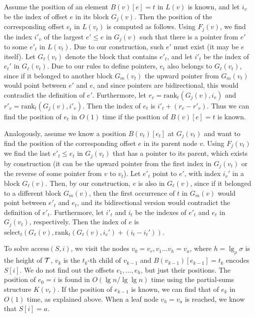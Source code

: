 \documentclass[11pt]{article}
\def\idrm#1{\ensuremath{\mathrm{#1}}}
\newcommand{\cT}{{\cal T}}
\newcommand{\cP}{{ K}}
\newcommand{\ra}{\idrm{rank}}
\newcommand{\sel}{\idrm{select}}
\newcommand{\acc}{\idrm{access}}
\begin{document}
Assume the position of an element $B(v)[e]=t$ in $L(v)$ is known, 
and let $i_v$ be the index of offset $e$ in its block $G_j(v)$. 
Then the position of the corresponding offset $e_t$ in $L(v_t)$ is computed as follows.
Using $F_j(v)$, we find the index $i'_v$ of the largest $e'\le e$ in $G_j(v)$ 
such that
there is a pointer from $e'$ to some $e'_t$ in $L(v_t)$. Due to our
construction, such $e'$ must exist (it may be $e$ itself). 
Let $G_\ell(v_t)$ denote the block that contains $e'_t$, and let
$i'_t$ be the index of $e_t'$ in $G_\ell(v_t)$.
Due to our rules to define pointers, $e_t$ also 
belongs to $G_\ell(v_t)$, since if it belonged to another block $G_m(v_t)$ 
the upward pointer from $G_m(v_t)$ would point between $e'$ and $e$,
and since pointers are bidirectional, this would contradict the definition of
$e'$. 
 Furthermore, let $r_v=\ra_t(G_j(v),i_v)$ and $r'_v=\ra_t(G_j(v),i'_v)$. 
Then the index of $e_t$ is $i'_t+ (r_v-r'_v)$. 
Thus we can find the position of $e_t$ in 
$O(1)$ time if the position of $B(v)[e]=t$ is known. 

Analogously, assume we know a position $B(v_t)[e_t]$ at $G_j(v_t)$ and want to 
find the position of the corresponding offset $e$ in its parent node $v$. Using $F_j(v_t)$ 
we find the last $e'_t \le e_t$ in $G_j(v_t)$ that has a pointer to its
parent, which exists by construction (it can be the upward pointer from the 
first index in $G_j(v_t)$ or the reverse of some pointer from $v$ to $v_t$). 
Let $e'_t$ point to $e'$, with index $i_v'$ in a block $G_\ell(v)$. 
Then, by our construction, $e$ is also in $G_\ell(v)$, since if it belonged
to a different block $G_m(v)$, then the first occurrence of $t$ in $G_m(v)$
would point between $e'_t$ and $e_t$, and its bidirectional version would 
contradict the definition of $e'_t$.
Furthermore, let
$i'_t$ and $i_t$ be the indexes of $e'_t$ and $e_t$ in $G_j(v_t)$, respectively.
Then the index of $e$ is 
$\sel_t(G_\ell(v),\ra_t(G_\ell(v),i_v')+(i_t-i_t'))$.

To solve $\acc(S,i)$, we visit the nodes $v_0=v_r,v_1\ldots v_h=v_a$, where 
$h=\lg_\rho \sigma$ is the height of $\cT$,
$v_k$ is the $t_k$-th child of $v_{k-1}$ and $B(v_{k-1})[e_{k-1}]=t_k$ encodes 
$S[i]$. We do not find out the offsets $e_1,\ldots,e_h$, but just their
positions. The position of $e_0=i$ is found in $O(\lg n/\lg \lg n)$ 
time  using the partial-sums structure $\cP(v_r)$. 
If the position of  $e_{k-1}$ is known, we can find that of $e_k$ in 
$O(1)$ time, as explained above. 
When a leaf node $v_h=v_a$ is reached, we know that  $S[i]=a$.
\end{document}
